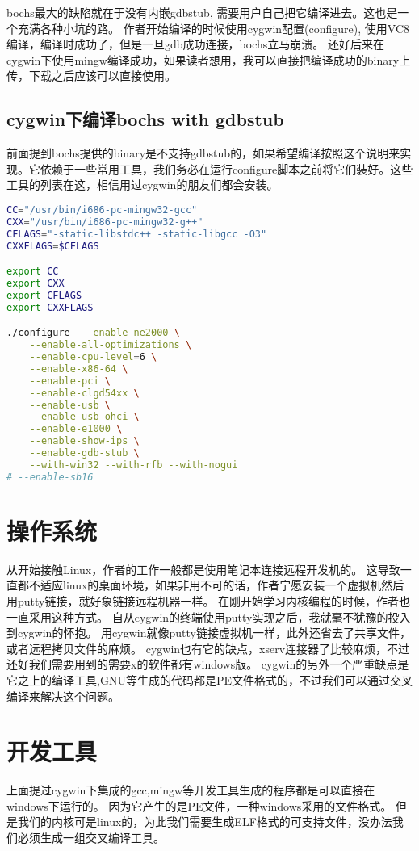 bochs最大的缺陷就在于没有内嵌gdbstub, 需要用户自己把它编译进去。这也是一个充满各种小坑的路。
作者开始编译的时候使用cygwin配置(configure), 使用VC8编译，编译时成功了，但是一旦gdb成功连接，bochs立马崩溃。
还好后来在cygwin下使用mingw编译成功，如果读者想用，我可以直接把编译成功的binary上传，下载之后应该可以直接使用。

\subsection{cygwin下编译bochs with gdbstub}
前面提到bochs提供的binary是不支持gdbstub的，如果希望编译按照这个说明来实现。它依赖于一些常用工具，我们务必在运行configure脚本之前将它们装好。这些工具的列表在这，相信用过cygwin的朋友们都会安装。

\begin{lstlisting}[language=bash]
CC="/usr/bin/i686-pc-mingw32-gcc"
CXX="/usr/bin/i686-pc-mingw32-g++"
CFLAGS="-static-libstdc++ -static-libgcc -O3"
CXXFLAGS=$CFLAGS

export CC
export CXX
export CFLAGS
export CXXFLAGS

./configure  --enable-ne2000 \
    --enable-all-optimizations \
    --enable-cpu-level=6 \
    --enable-x86-64 \
    --enable-pci \
    --enable-clgd54xx \
    --enable-usb \
    --enable-usb-ohci \
    --enable-e1000 \
    --enable-show-ips \
    --enable-gdb-stub \
    --with-win32 --with-rfb --with-nogui
# --enable-sb16
\end{lstlisting}
\section{操作系统}
从开始接触Linux，作者的工作一般都是使用笔记本连接远程开发机的。
这导致一直都不适应linux的桌面环境，如果非用不可的话，作者宁愿安装一个虚拟机然后用putty链接，就好象链接远程机器一样。
在刚开始学习内核编程的时候，作者也一直采用这种方式。
自从cygwin的终端使用putty实现之后，我就毫不犹豫的投入到cygwin的怀抱。
用cygwin就像putty链接虚拟机一样，此外还省去了共享文件，或者远程拷贝文件的麻烦。
cygwin也有它的缺点，xserv连接器了比较麻烦，不过还好我们需要用到的需要x的软件都有windows版。
cygwin的另外一个严重缺点是它之上的编译工具,GNU等生成的代码都是PE文件格式的，不过我们可以通过交叉编译来解决这个问题。
\section{开发工具}

上面提过cygwin下集成的gcc,mingw等开发工具生成的程序都是可以直接在windows下运行的。
因为它产生的是PE文件，一种windows采用的文件格式。
但是我们的内核可是linux的，为此我们需要生成ELF格式的可支持文件，没办法我们必须生成一组交叉编译工具。

